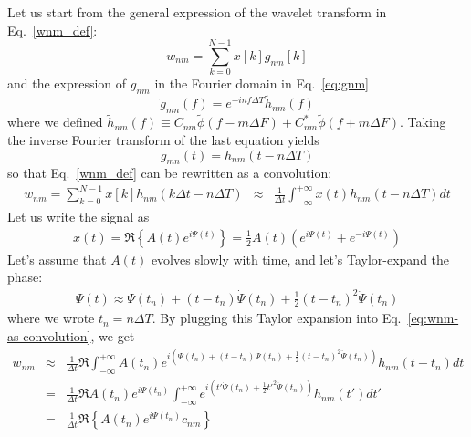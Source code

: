 \documentclass{article}
\begin{document}
Let us start from the general expression of the wavelet transform in Eq.~\eqref{wnm_def}:
\begin{equation*}
w_{nm}=\sum_{k=0}^{N-1}x[k]g_{nm}[k]
\end{equation*}
and the expression of $g_{nm}$ in the Fourier domain in Eq.~\eqref{eq:gnm}
\begin{equation*}
\tilde g_{mn}(f)=e^{-in f \Delta T} \tilde{h}_{nm}(f)
\end{equation*}
where we defined $\tilde{h}_{nm}(f) \equiv C_{nm}\tilde\phi(f-m\Delta F)+C^*_{nm}\tilde\phi(f+m\Delta F)$. Taking the inverse Fourier transform of the last equation yields
\begin{equation*}
g_{mn}(t)= h_{nm}(t - n \Delta T)
\end{equation*}
so that Eq.~\eqref{wnm_def} can be rewritten as a convolution:
\begin{eqnarray}
\label{eq:wnm-as-convolution}
w_{nm} = \sum_{k=0}^{N-1} x[k] h_{nm}(k \Delta t - n \Delta T) & \approx & \frac{1}{\Delta t} \int_{-\infty}^{+\infty} x(t) h_{nm}(t - n \Delta T) dt %
\end{eqnarray}
Let us write the signal as
\begin{eqnarray}
\label{eq:time_waveform_amp_phase}
    x(t) = \Re\left\{A(t) e^{i \Psi(t)} \right\} = \frac{1}{2}A(t)\left(e^{i \Psi(t)} + e^{-i \Psi(t)}\right)
\end{eqnarray}
Let's assume that $A(t)$ evolves slowly with time, and let's Taylor-expand the phase:
\begin{eqnarray}
\label{eq:time_waveform_expansion}
    \Psi(t) \approx \Psi(t_n) + (t - t_n)\dot{\Psi}(t_n) + \frac{1}{2} (t-t_n)^2 \ddot{\Psi}(t_n)
\end{eqnarray}
where we wrote $t_n = n \Delta T$.
By plugging this Taylor expansion into Eq.~\eqref{eq:wnm-as-convolution}, we get
\begin{eqnarray}
\label{eq:wnm-as-convolution-taylor}
w_{nm} & \approx & \frac{1}{\Delta t} \Re \int_{-\infty}^{+\infty} A(t_n) e^{i\left(\Psi(t_n) + (t - t_n)\dot{\Psi}(t_n) + \frac{1}{2} (t-t_n)^2 \ddot{\Psi}(t_n) \right)} h_{nm}(t - t_n) dt \nonumber \\
& = & \frac{1}{\Delta t} \Re A(t_n) e^{i\Psi(t_n)}\int_{-\infty}^{+\infty} e^{i\left(t'\dot{\Psi}(t_n) + \frac{1}{2} {t'}^2 \ddot{\Psi}(t_n) \right)} h_{nm}(t') dt' \nonumber \\
& = & \frac{1}{\Delta t} \Re \left\{A(t_n) e^{i\Psi(t_n)} c_{nm}\right\}
\end{eqnarray}
\end{document}
